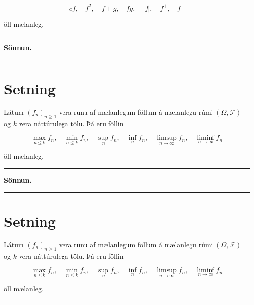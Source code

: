 \documentclass[]{book}
\begin{document}
\[
cf, \quad f^2, \quad f + g, \quad fg, \quad |f|, \quad f^+, \quad f^-
\]

öll mælanleg.

\begin{center}\rule{0.5\linewidth}{\linethickness}\end{center}

\textbf{Sönnun.}

\begin{center}\rule{0.5\linewidth}{\linethickness}\end{center}

\hypertarget{setning-35}{%
\section{Setning}\label{setning-35}}

Látum \((f_n)_{n\geq1}\) vera runu af mælanlegum föllum á mælanlegu rúmi \((\Omega, \mathcal F)\) og \(k\) vera náttúrulega tölu. Þá eru föllin

\[
\max_{n\leq k}f_n, \quad \min_{n\leq k}f_n, \quad \sup_n f_n, \quad \inf_n f_n, \quad \limsup_{n\rightarrow\infty}f_n, \quad \liminf_{n\rightarrow\infty}f_n
\]

öll mælanleg.

\begin{center}\rule{0.5\linewidth}{\linethickness}\end{center}

\textbf{Sönnun.}

\begin{center}\rule{0.5\linewidth}{\linethickness}\end{center}

\hypertarget{setning-36}{%
\section{Setning}\label{setning-36}}

Látum \((f_n)_{n\geq1}\) vera runu af mælanlegum föllum á mælanlegu rúmi \((\Omega, \mathcal F)\) og \(k\) vera náttúrulega tölu. Þá eru föllin

\[
\max_{n\leq k}f_n, \quad \min_{n\leq k}f_n, \quad \sup_n f_n, \quad \inf_n f_n, \quad \limsup_{n\rightarrow\infty}f_n, \quad \liminf_{n\rightarrow \infty}f_n
\]

öll mælanleg.

\begin{center}\rule{0.5\linewidth}{\linethickness}\end{center}
\end{document}
